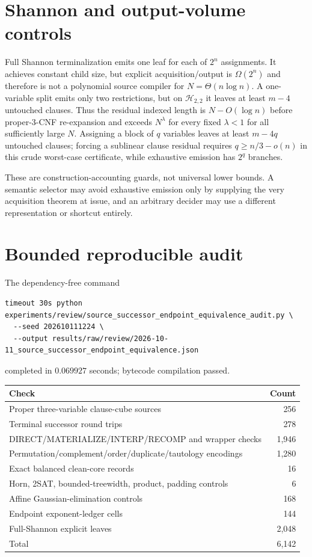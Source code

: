 \documentclass[11pt]{article}
\newcommand{\Htwo}{\mathcal H_{2,2}}
\begin{document}
\section{Shannon and output-volume controls}

Full Shannon terminalization emits one leaf for each of $2^n$ assignments.
It achieves constant child size, but explicit acquisition/output is
$\Omega(2^n)$ and therefore is not a polynomial source compiler for
$N=\Theta(n\log n)$.  A one-variable split emits only two restrictions, but
on $\Htwo$ it leaves at least $m-4$ untouched clauses.  Thus the residual
indexed length is $N-O(\log n)$ before proper-3-CNF re-expansion and exceeds
$N^\lambda$ for every fixed $\lambda<1$ for all sufficiently large $N$.
Assigning a block of $q$ variables leaves at least $m-4q$ untouched clauses;
forcing a sublinear clause residual requires $q\ge n/3-o(n)$ in this crude
worst-case certificate, while exhaustive emission has $2^q$ branches.

These are construction-accounting guards, not universal lower bounds.  A
semantic selector may avoid exhaustive emission only by supplying the very
acquisition theorem at issue, and an arbitrary decider may use a different
representation or shortcut entirely.

\section{Bounded reproducible audit}

The dependency-free command
\begin{verbatim}
timeout 30s python experiments/review/source_successor_endpoint_equivalence_audit.py \
  --seed 202610111224 \
  --output results/raw/review/2026-10-11_source_successor_endpoint_equivalence.json
\end{verbatim}
completed in $0.069927$ seconds; bytecode compilation passed.

\begin{center}
\begin{tabular}{lr}
\toprule
Check & Count\\
\midrule
Proper three-variable clause-cube sources & 256\\
Terminal successor round trips & 278\\
DIRECT/MATERIALIZE/INTERP/RECOMP and wrapper checks & 1,946\\
Permutation/complement/order/duplicate/tautology encodings & 1,280\\
Exact balanced clean-core records & 16\\
Horn, 2SAT, bounded-treewidth, product, padding controls & 6\\
Affine Gaussian-elimination controls & 168\\
Endpoint exponent-ledger cells & 144\\
Full-Shannon explicit leaves & 2,048\\
\midrule
Total & 6,142\\
\bottomrule
\end{tabular}
\end{center}
\end{document}
